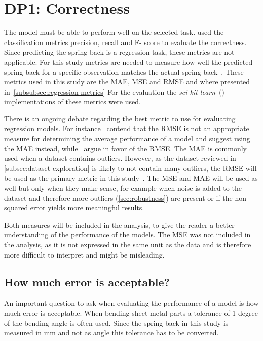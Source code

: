 \section{DP1: Correctness}\label{sec:dp1:-correctness}

The model must be able to perform well on the selected task.
\cite{siebert2022construction} used the classification metrics precision, recall and F- score to evaluate the
correctness.
Since predicting the spring back is a regression task, these metrics are not applicable.
For this study metrics are needed to measure how well the predicted spring back for a specific observation
matches the actual spring back~\cite[p. 29]{hastie2009elements}.
These metrics used in this study are the MAE, MSE and RMSE and where presented in~\cref{subsubsec:regression-metrics}
For the evaluation the \textit{sci-kit learn}~(\cite{scikit-learn}) implementations of these metrics were used.

There is an ongoing debate regarding the best metric to use for evaluating regression models.
For instance~\cite{willmott2005advantages} contend that the RMSE is not an appropriate measure for determining the
average performance of a model and suggest using the MAE instead, while~\cite{chai2014root} argue in favor of the RMSE.
The MAE is commonly used when a dataset contains outliers.
However, as the dataset reviewed in \cref{subsec:dataset-exploration} is likely to not contain many outliers, the
RMSE will be used as the primary metric in this study~\cite[p. 1249]{chai2014root}.
The MSE and MAE will be used as well but only when they make sense, for example when noise is added to the dataset
and therefore more outliers (\cref{sec:robustness}) are present or if the non squared error yields more meaningful
results.

Both measures will be included in the analysis, to give the reader a better understanding of the performance of
the models.
The MSE was not included in the analysis, as it is not expressed in the same unit as the data and is therefore
more difficult to interpret and might be misleading.

\subsection*{How much error is acceptable?}

An important question to ask when evaluating the performance of a model is how much error is acceptable.
When bending sheet metal parts a tolerance of 1 degree of the bending angle is often used.
Since the spring back in this study is measured in mm and not as angle this tolerance has to be converted.

